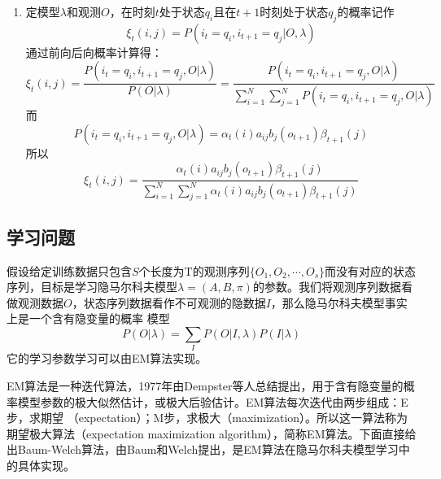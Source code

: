 \begin{enumerate}
            \item 定模型$\lambda $和观测$O$，在时刻$t$处于状态$q_i$且在$t+1$时刻处于状态$q_j$的概率记作
                \begin{equation}
                    {\xi _t}(i,j) = P({i_t} = {q_i},{i_{t + 1}} = {q_j}|O,\lambda )
                \end{equation}
                通过前向后向概率计算得：
                \[{\xi _t}(i,j) = \frac{{P({i_t} = {q_i},{i_{t + 1}} = {q_j},O|\lambda )}}{{P(O|\lambda )}} = \frac{{P({i_t} = {q_i},{i_{t + 1}} = {q_j},O|\lambda )}}{{\sum\limits_{i = 1}^N {\sum\limits_{j = 1}^N {P({i_t} = {q_i},{i_{t + 1}} = {q_j},O|\lambda )} } }}\]
                而
                \[P({i_t} = {q_i},{i_{t + 1}} = {q_j},O|\lambda ) = {\alpha _t}(i){a_{ij}}{b_j}({o_{t + 1}}){\beta _{t + 1}}(j)\]
                所以
                \begin{equation}\label{equation:xi}
                {\xi _t}(i,j) = \frac{{{\alpha _t}(i){a_{ij}}{b_j}({o_{t + 1}}){\beta _{t + 1}}(j)}}{{\sum\limits_{i = 1}^N {\sum\limits_{j = 1}^N {{\alpha _t}(i){a_{ij}}{b_j}({o_{t + 1}}){\beta _{t + 1}}(j)} } }}
                \end{equation}
        \end{enumerate}
    \subsection{学习问题}\label{section:learn}
        假设给定训练数据只包含$S$个长度为T的观测序列$\{ {O_1},{O_2}, \cdots ,{O_s}\} $而没有对应的状态序列，目标是学习隐马尔科夫模型$\lambda  = \left( {A,B,\pi } \right)$的参数。我们将观测序列数据看做观测数据$O$，状态序列数据看作不可观测的隐数据$I$，那么隐马尔科夫模型事实上是一个含有隐变量的概率
        模型
        \begin{equation}
        P(O|\lambda ) = \sum\limits_I {P(O|I,\lambda )P(I|\lambda )}
        \end{equation}
        它的学习参数学习可以由EM算法实现。

        EM算法是一种迭代算法，1977年由Dempster等人总结提出，用于含有隐变量的概率模型参数的极大似然估计，或极大后验估计。EM算法每次迭代由两步组成：E步，求期望
        （expectation）；M步，求极大（maximization）。所以这一算法称为期望极大算法（expectation maximization algorithm），简称EM算法。下面直接给出Baum-Welch算法，由Baum和Welch提出，是EM算法在隐马尔科夫模型学习中的具体实现。


